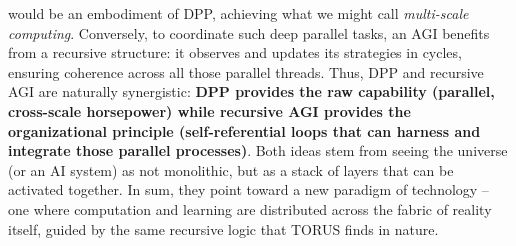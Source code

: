 \documentclass[]{article}
\begin{document}
\begin{itemize}
  would be an embodiment of DPP, achieving what we might call
  \emph{multi-scale computing}. Conversely, to coordinate such deep
  parallel tasks, an AGI benefits from a recursive structure: it
  observes and updates its strategies in cycles, ensuring coherence
  across all those parallel threads. Thus, DPP and recursive AGI are
  naturally synergistic: \textbf{DPP provides the raw capability
  (parallel, cross-scale horsepower) while recursive AGI provides the
  organizational principle (self-referential loops that can harness and
  integrate those parallel processes)}. Both ideas stem from seeing the
  universe (or an AI system) as not monolithic, but as a stack of layers
  that can be activated together. In sum, they point toward a new
  paradigm of technology -- one where computation and learning are
  distributed across the fabric of reality itself, guided by the same
  recursive logic that TORUS finds in nature.
\end{itemize}
\end{document}
